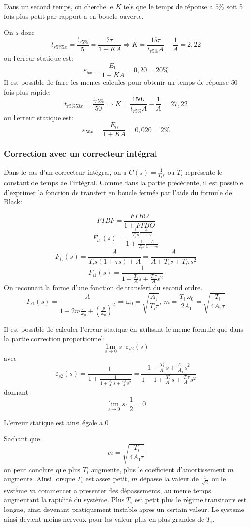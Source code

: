 \documentclass[12pt, a4paper]{report}
\begin{document}
Dans un second temps, on cherche le $K$ tels que le temps de réponse a $5\%$ soit
5 fois plus petit par rapport a en boucle ouverte.

On a donc 
\[
    t_{r5\%5x} = \frac{t_{r5\%}}{5} = \frac{3\tau}{1 + KA} \Rightarrow K = \frac{15 \tau}{t_{r5\%} A} - \frac{1}{A} = 2,22
\]
ou l'erreur statique est:
\[
    \varepsilon_{5x} = \frac{E_0}{1 + KA} =  0,20 = 20\%
\]
Il est possible de faire les memes calcules pour obtenir un temps de réponse 50 fois plus rapide:
\[
    t_{r5\%50x} = \frac{t_{r5\%}}{50} \Rightarrow K = \frac{150 \tau}{t_{r5\%} A} - \frac{1}{A} = 27,22
\]
ou l'erreur statique est:
\[
    \varepsilon_{50x} = \frac{E_0}{1 + KA} =  0,020 = 2\%
\]

\subsubsection{Correction avec un correcteur intégral}

Dans le cas d'un correcteur intégral, on a $C(s) = \frac{1}{T_i s}$ ou $T_i$ représente
le constant de temps de l'intégral.
Comme dans la partie précédente, il est possible d'exprimer la fonction de transfert
en boucle fermée par l'aide du formule de Black:

\[
    FTBF = \frac{FTBO}{1 + FTBO}
\]
\[
    F_{i1}(s) = \frac{\frac{1}{T_i s} \frac{A}{1 + \tau s}}{1 + \frac{1}{T_i s} \frac{A}{1 + \tau s}}
\]
\[
    F_{i1}(s) = \frac{A}{T_i s(1 + \tau s) + A} = \frac{A}{A + T_i s + T_i \tau s^2}
\]
\[
    F_{i1}(s) = \frac{1}{1 + \frac{T_i}{A} s + \frac{T_i \tau}{A} s^2}  
\]
On reconnait la forme d'une fonction de transfert du second ordre.
\[
    F_{i1}(s) = \frac{A}{1 + 2m \frac{s}{\omega_{0}} + \left( \frac{p}{\omega_0} \right)^2} \Rightarrow \omega_0 = \sqrt{\frac{A_1}{T_i \tau}},\ m = \frac{T_i\ \omega_0}{2 A_1} = \sqrt{\frac{T_i}{4 A_1 \tau}}
\]

Il est possible de calculer l'erreur statique en utilisant le meme formule que dans la 
partie correction proportionnel:
\[
    \lim_{s \rightarrow 0} s \cdot  \varepsilon_{s2} (s) 
\]
avec
\[
    \varepsilon_{s2}(s) = \frac{1}{1 + \frac{1}{1 + \frac{T_i}{A_1}s + \frac{T_i \tau}{A_1} s^2}} = \frac{1 + \frac{T_i}{A_1}s + \frac{T_i \tau}{A_1} s^2}{1 + 1 + \frac{T_i}{A_1}s + \frac{T_i \tau}{A_1} s^2}  
\]
donnant
\[
    \lim_{s \rightarrow 0} s \cdot \frac{1}{2} = 0
\]

L'erreur statique est ainsi égale a 0.

Sachant que
\[
    m = \sqrt{\frac{T_i}{4 A_1 \tau}}  
\]
on peut conclure que plus $T_i$ augmente, plus le coefficient d'amortissement $m$ augmente. Ainsi lorsque $T_i$
est assez petit, $m$ dépasse la valeur de $\frac{1}{\sqrt{2}}$ ou le système va commencer a presenter
des dépassements, au meme temps augmentant la rapidité du système. Plus $T_i$ est petit plus le régime transitoire est longue,
ainsi devenant pratiquement instable apres un certain valeur. Le systeme ainsi devient moins nerveux pour les
valeur plus en plus grandes de $T_i$.
\end{document}
